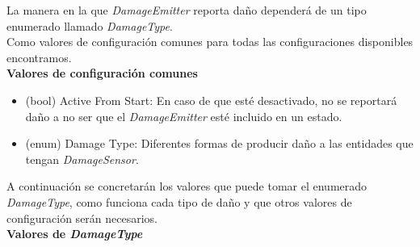 La manera en la que \textit{DamageEmitter} reporta daño dependerá de un tipo enumerado llamado \textit{DamageType}.\\
Como valores de configuración comunes para todas las configuraciones disponibles encontramos.\\

\textbf{Valores de configuración comunes}
\begin{itemize}
	\item (bool) Active From Start: En caso de que esté desactivado, no se reportará daño a no ser que el \textit{DamageEmitter} esté incluido en un estado.
	\item (enum) Damage Type: Diferentes formas de producir daño a las entidades que tengan \textit{DamageSensor}.
\end{itemize}

A continuación se concretarán los valores que puede tomar el enumerado \textit{DamageType}, como funciona cada tipo de daño y que otros valores de configuración serán necesarios.\\

\textbf{Valores de \textit{DamageType}}

